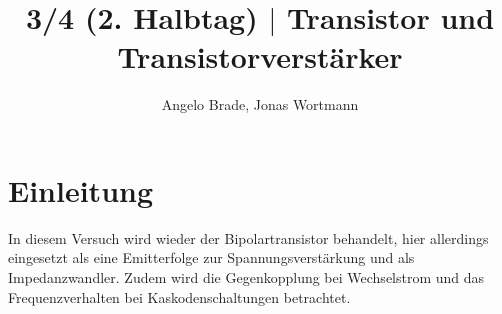 \documentclass[a4paper,12pt]{article}
\numberwithin{equation}{section}
\begin{document}

\title{3/4 (2. Halbtag) $|$ Transistor und Transistorverstärker}
\author{Angelo Brade, Jonas Wortmann}
\maketitle
{}


\newpage


\fancyhead[L]{\thepage}
\fancyfoot[C]{}

\tableofcontents


\newpage


\fancyhead[R]{\leftmark\\\rightmark}

\newpage
\section{Einleitung}
In diesem Versuch wird wieder der Bipolartransistor behandelt, hier allerdings eingesetzt als eine Emitterfolge zur Spannungsverstärkung und als Impedanzwandler.
Zudem wird die Gegenkopplung bei Wechselstrom und das Frequenzverhalten bei Kaskodenschaltungen betrachtet.

\newpage
\end{document}
